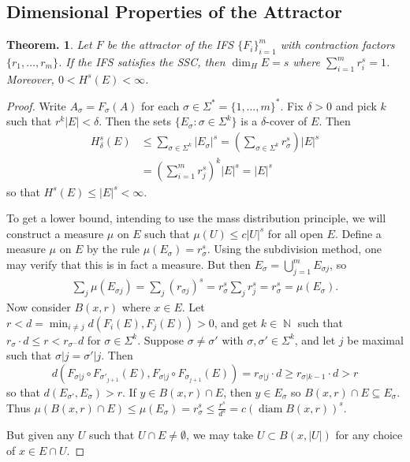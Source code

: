 \documentclass[11pt, a4paper]{memoir}
\DeclareMathOperator{\N}{{\mathbb{N}}}
\theoremstyle{change}
\newtheorem{theorem}{Theorem.}[section]
\theoremstyle{plain}
\theoremstyle{nonumberplain}
\newtheorem{proof}{Proof}
\DeclareMathOperator{\diam}{diam}
\numberwithin{equation}{section}
\begin{document}
\subsection{Dimensional Properties of the Attractor}
\begin{theorem}
    Let $F$ be the attractor of the IFS $\{F_i\}_{i=1}^m$ with contraction factors $\{r_1,\ldots,r_m\}$.
    If the IFS satisfies the SSC, then $\dim_HE=s$ where $\sum_{i=1}^m r_i^s=1$.
    Moreover, $0<H^s(E)<\infty$.
\end{theorem}
\begin{proof}
    Write $A_\sigma=F_\sigma(A)$ for each $\sigma\in\Sigma^*=\{1,\ldots,m\}^*$.
    Fix $\delta>0$ and pick $k$ such that $r^k|E|<\delta$.
    Then the sets $\{E_\sigma:\sigma\in\Sigma^k\}$ is a $\delta$-cover of $E$.
    Then
    \begin{align*}
        H_\delta^s(E)&\leq\sum_{\sigma\in\Sigma^k}|E_\sigma|^s = \left(\sum_{\sigma\in\Sigma^k}r_\sigma^s\right)|E|^s\\
                     &= \left(\sum_{i=1}^m r_j^s\right)^k|E|^s=|E|^s
    \end{align*}
    so that $H^s(E)\leq|E|^s<\infty$.

    To get a lower bound, intending to use the mass distribution principle, we will construct a measure $\mu$ on $E$ such that $\mu(U)\leq c|U|^s$ for all open $E$.
    Define a measure $\mu$ on $E$ by the rule $\mu(E_\sigma)=r_\sigma^s$.
    Using the subdivision method, one may verify that this is in fact a measure.
    But then $E_\sigma=\bigcup_{j=1}^m E_{\sigma j}$, so
    \begin{align*}
        \sum_j\mu(E_{\sigma j})=\sum_j(r_{\sigma j})^s=r_\sigma^s\sum_j r_j^s=r_\sigma^s=\mu(E_\sigma).
    \end{align*}
    Now consider $B(x,r)$ where $x\in E$.
    Let $r<d=\min_{i\neq j}d(F_i(E),F_j(E))>0$, and get $k\in\N$ such that $r_\sigma\cdot d\leq r<r_{\sigma^-}d$ for $\sigma\in\Sigma^k$.
    Suppose $\sigma\neq\sigma'$ with $\sigma,\sigma'\in\Sigma^k$, and let $j$ be maximal such that $\sigma|j=\sigma'|j$.
    Then
    \begin{equation*}
        d(F_{\sigma|j}\circ F_{\sigma'_{j+1}}(E),F_{\sigma|j}\circ F_{\sigma_{j+1}}(E))=r_{\sigma|j}\cdot d\geq r_{\sigma|k-1}\cdot d>r
    \end{equation*}
    so that $d(E_{\sigma'},E_\sigma)>r$.
    If $y\in B(x,r)\cap E$, then $y\in E_\sigma$ so $B(x,r)\cap E\subseteq E_\sigma$.
    Thus $\mu(B(x,r)\cap E)\leq\mu(E_\sigma)=r_\sigma^s\leq\frac{r^s}{d^s}=c(\diam B(x,r))^s$.

    But given any $U$ such that $U\cap E\neq\emptyset$, we may take $U\subset B(x,|U|)$ for any choice of $x\in E\cap U$.
\end{proof}
\end{document}
